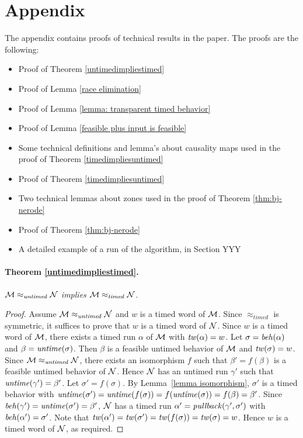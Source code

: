 \section{Appendix}
The appendix contains proofs of technical results in the paper.
The proofs are the following:
\begin{itemize}
\item
Proof of Theorem \ref{untimedimpliestimed}
\item 
Proof of Lemma \ref{race elimination}
\item 
Proof of Lemma \ref{lemma: transparent timed behavior}
\item 
Proof of Lemma \ref{feasible plus input is feasible}
\item 
Some technical definitions and lemma's about causality maps used in the proof of
Theorem \ref{timedimpliesuntimed}
\item 
Proof of Theorem \ref{timedimpliesuntimed}
\item 
Two technical lemmas about zones used in the proof of Theorem \ref{thm:bj-nerode}
\item 
Proof of Theorem \ref{thm:bj-nerode}
\item
A detailed example of a run of the algorithm, in Section YYY
\end{itemize}



\paragraph{Theorem \ref{untimedimpliestimed}.}
\emph{${\mathcal M} \approx_{\mathit{untimed}} {\mathcal N}$
implies
${\mathcal M} \approx_{\mathit{timed}} {\mathcal N}$.}

\begin{proof}
Assume ${\mathcal M} \approx_{\mathit{untimed}} {\mathcal N}$ and $w$ is a timed word of ${\mathcal M}$.
Since $\approx_{\mathit{timed}}$ is symmetric, it suffices to prove that $w$ is a timed word of ${\mathcal N}$.
Since $w$ is a timed word of ${\mathcal M}$,
there exists a timed run $\alpha$ of ${\mathcal M}$ with $\mathit{tw}(\alpha) = w$. 
Let $\sigma = \mathit{beh}(\alpha)$ and $\beta = \mathit{untime}(\sigma)$. 
Then $\beta$ is a feasible untimed behavior of ${\mathcal M}$ and $\mathit{tw}(\sigma) = w$.
Since  ${\mathcal M} \approx_{\mathit{untimed}} {\mathcal N}$, there exists an isomorphism $f$ such that 
$\beta' = f(\beta)$ is a feasible untimed behavior of ${\mathcal N}$.
Hence ${\mathcal N}$ has an untimed run $\gamma'$ such that $\mathit{untime}(\gamma') = \beta'$.
Let $\sigma' = f(\sigma)$.
By Lemma~\ref{lemma isomorphism}, $\sigma'$ is a timed behavior with 
$\mathit{untime}(\sigma') = \mathit{untime}(f(\sigma)) = f(\mathit{untime}(\sigma)) = f(\beta) = \beta'$.
Since $\mathit{beh}(\gamma') = \mathit{untime}(\sigma') = \beta'$, ${\mathcal N}$ has a timed run $\alpha' = \mathit{pullback}(\gamma',\sigma')$ with
$\mathit{beh}(\alpha') = \sigma'$.
Note that $\mathit{tw}(\alpha') = \mathit{tw}(\sigma') = \mathit{tw}(f(\sigma)) = \mathit{tw}(\sigma) = w$.
Hence $w$ is a timed word of ${\mathcal N}$, as required.
\end{proof}

